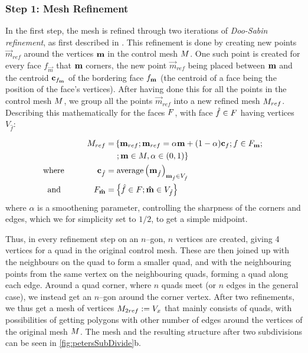 \subsubsection{Step 1: Mesh Refinement}
In the first step, the mesh is refined through two iterations of \emph{Doo-Sabin refinement}, as first described in \cite{DooSabin1978subdiv}. This refinement is done by creating new points $\vec{m}_{ref}$ around the vertices $\petersControlMeshVec$ in the control mesh $\petersControlMesh$. One such point is created for every face $f_{\vec{m}}$ that $\petersControlMeshVec$ corners, the new point $\vec{m}_{ref}$ being placed between $\petersControlMeshVec$ and the centroid $\centroidof{f_{\petersControlMeshVec}}$ of the bordering face $f_{\petersControlMeshVec}$ (the centroid of a face being the position of the face's vertices). After having done this for all the points in the control mesh $\petersControlMesh$, we group all the points $\vec{m}_{ref}$ into a new refined mesh $\petersControlMeshRef$. Describing this mathematically for the faces $\petersFaces$, with face ${\hat{f}}\in \petersFaces$ having vertices $V_{\hat{f}}$:

\begin{align}
\petersControlMeshRef =& \left\lbrace \petersControlMeshVec_{ref} \suchthat\petersControlMeshVec_{ref} = \alpha\petersControlMeshVec + (1-\alpha)\centroidof{f} \suchthat f \in \facesof{\petersControlMeshVec} \suchthat \right.
\\ \notag &
 \left. \suchthat \petersControlMeshVec \in \petersControlMesh, \alpha \in (0,1) \right\rbrace
\\
\where \qquad\qquad \centroidof{\hat{f}} =& \; \text{average}\left(\petersControlMeshVec_{\hat{f}}\right)_{\petersControlMeshVec_{\hat{f}} \in \verticesof{\hat{f}}}
\\
\text{and} \qquad\qquad F_{\vec{\hat{m}}} =& \left\lbrace \hat{f} \in \petersFaces \suchthat \vec{\hat{m}} \in \verticesof{\hat{f}}	\right\rbrace
\end{align}
where $\alpha$ is a smoothening parameter, controlling the sharpness of the corners and edges, which we for simplicity set to $1/2$, to get a simple midpoint.

Thus, in every refinement step on an $n$--gon, $n$ vertices are created, giving 4 vertices for a quad in the original control mesh. These are then joined up with the neighbours on the quad to form a smaller quad, and with the neighbouring points from the same vertex on the neighbouring quads, forming a quad along each edge. Around a quad corner, where $n$ quads meet (or $n$ edges in the general case), we instead get an $n$--gon around the corner vertex. After two refinements, we thus get a mesh of vertices $\petersControlMeshDobRef := \petersPatchPoints$ that mainly consists of quads, with possibilities of getting polygons with other number of edges around the vertices of the original mesh $\petersControlMesh$. The mesh and the resulting structure after two subdivisions can be seen in \autoref{fig:petersSubDivide}b.

